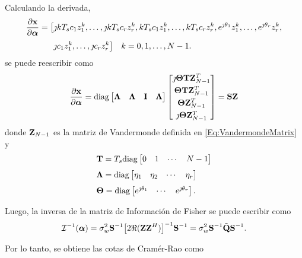 			Calculando la derivada, 
			\begin{equation}
				\begin{aligned} \frac{\partial\mathbf{x}}{\partial\boldsymbol{\alpha}} = \big[& \jmath kT_sc_1z_1^k,\ldots,\jmath kT_sc_rz_r^k,kT_sc_1z_1^k,\ldots,kT_sc_rz_r^k,e^{\jmath\theta_1}z_1^k,\ldots,e^{\jmath\theta_r}z_r^k,\\[0.3em]
				& \jmath c_1z_1^k,\ldots,\jmath c_rz_r^k\big] \quad k=0,1,\ldots,N-1. \end{aligned}
				\label{Eq:Partialderivatives}
			\end{equation}
			se puede reescribir como
			\begin{equation}
				\frac{\partial\mathbf{x}}{\partial\boldsymbol{\alpha}} = \mathrm{diag}\begin{bmatrix} \boldsymbol{\Lambda} & \boldsymbol{\Lambda} & \mathbf{I} & \boldsymbol{\Lambda}			\end{bmatrix}\begin{bmatrix}\jmath\boldsymbol{\Theta}\mathbf{T}\mathbf{Z}_{N-1}^T\\[0.3em] \boldsymbol{\Theta}\mathbf{T}\mathbf{Z}_{N-1}^T\\[0.3em] \boldsymbol{\Theta}\mathbf{Z}_{N-1}^T \\[0.3em] \jmath\boldsymbol{\Theta}\mathbf{Z}_{N-1}^T
				\end{bmatrix} = \mathbf{S}\mathbf{Z}
			\end{equation}
			donde $\mathbf{Z}_{N-1}$ es la matriz de Vandermonde definida en \eqref{Eq:VandermondeMatrix} y
			\[\begin{aligned} & \mathbf{T} =T_s\mathrm{diag} \begin{bmatrix}0 & 1 & \cdots & N-1
			\end{bmatrix}\\[0.3em] 
			& \boldsymbol{\Lambda} = \mathrm{diag}\begin{bmatrix} \eta_1 & \eta_2 & \cdots & \eta_r 	\end{bmatrix}\\[0.3em]
			& \boldsymbol{\Theta} = \mathrm{diag}\begin{bmatrix}e^{\jmath\theta_1} & \cdots & e^{\jmath\theta_r}
			\end{bmatrix}.\end{aligned}\]
			
			Luego, la inversa de la matriz de Información de Fisher se puede escribir como
			\begin{equation}
				\mathcal{I}^{-1}(\boldsymbol{\alpha}) = \sigma_w^2\mathbf{S}^{-1}\big[2\Re(\mathbf{Z}\mathbf{Z}^H)\big]^{-1}\mathbf{S}^{-1} = \sigma_w^2\mathbf{S}^{-1}\tilde{\mathbf{Q}}\mathbf{S}^{-1}.
				\label{Eq:CRLB1}
			\end{equation}
			
			Por lo tanto, se obtiene las cotas de Cramér-Rao como
			
